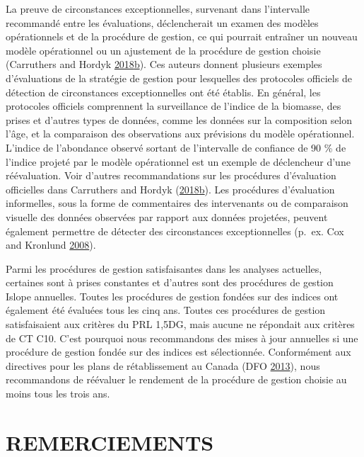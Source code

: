 \documentclass[11pt]{book}
\begin{document}
La preuve de circonstances exceptionnelles, survenant dans l'intervalle recommandé entre les évaluations, déclencherait un examen des modèles opérationnels et de la procédure de gestion, ce qui pourrait entraîner un nouveau modèle opérationnel ou un ajustement de la procédure de gestion choisie (Carruthers and Hordyk \protect\hyperlink{ref-carruthers_hordyk_2018}{2018}\protect\hyperlink{ref-carruthers_hordyk_2018}{b}). Ces auteurs donnent plusieurs exemples d'évaluations de la stratégie de gestion pour lesquelles des protocoles officiels de détection de circonstances exceptionnelles ont été établis. En général, les protocoles officiels comprennent la surveillance de l'indice de la biomasse, des prises et d'autres types de données, comme les données sur la composition selon l'âge, et la comparaison des observations aux prévisions du modèle opérationnel. L'indice de l'abondance observé sortant de l'intervalle de confiance de 90 \% de l'indice projeté par le modèle opérationnel est un exemple de déclencheur d'une réévaluation. Voir d'autres recommandations sur les procédures d'évaluation officielles dans Carruthers and Hordyk (\protect\hyperlink{ref-carruthers_hordyk_2018}{2018}\protect\hyperlink{ref-carruthers_hordyk_2018}{b}). Les procédures d'évaluation informelles, sous la forme de commentaires des intervenants ou de comparaison visuelle des données observées par rapport aux données projetées, peuvent également permettre de détecter des circonstances exceptionnelles (p.~ex. Cox and Kronlund \protect\hyperlink{ref-cox2008a}{2008}).

Parmi les procédures de gestion satisfaisantes dans les analyses actuelles, certaines sont à prises constantes et d'autres sont des procédures de gestion Islope annuelles. Toutes les procédures de gestion fondées sur des indices ont également été évaluées tous les cinq ans. Toutes ces procédures de gestion satisfaisaient aux critères du PRL 1,5DG, mais aucune ne répondait aux critères de CT C10. C'est pourquoi nous recommandons des mises à jour annuelles si une procédure de gestion fondée sur des indices est sélectionnée. Conformément aux directives pour les plans de rétablissement au Canada (DFO \protect\hyperlink{ref-dfo2013}{2013}), nous recommandons de réévaluer le rendement de la procédure de gestion choisie au moins tous les trois ans.

\clearpage

\hypertarget{remerciements}{%
\section{REMERCIEMENTS}\label{remerciements}}
\end{document}
